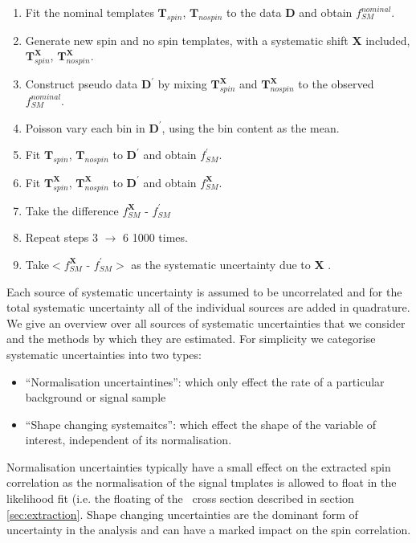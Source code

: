 \begin{enumerate}
	\item Fit the nominal templates $\mathbf{T}_{spin}$, $\mathbf{T}_{nospin}$ to the data $\mathbf{D}$ and obtain $f_{SM}^{nominal}$.
	\item Generate new spin and no spin templates, with a systematic shift \textbf{X} included, $\mathbf{T}^{\mathbf{X}}_{spin}$, $\mathbf{T}^{\mathbf{X}}_{nospin}$.
	\item Construct pseudo data $\mathbf{D^\prime}$ by mixing $\mathbf{T}^{\mathbf{X}}_{spin}$ and $\mathbf{T}^{\mathbf{X}}_{nospin}$ to the observed $f_{SM}^{nominal}$. 
        \item Poisson vary each bin in $\mathbf{D^\prime}$, using the bin content as the mean.
	\item Fit $\mathbf{T}_{spin}$, $\mathbf{T}_{nospin}$ to $\mathbf{D^\prime}$ and obtain $f_{SM}^{\prime}$.
	\item Fit $\mathbf{T}^{\mathbf{X}}_{spin}$, $\mathbf{T}^{\mathbf{X}}_{nospin}$ to $\mathbf{D^\prime}$ and obtain $f_{SM}^{\mathbf{X}}$.
	\item Take the difference $f_{SM}^{\mathbf{X}}$ - $f_{SM}^{\prime}$
	\item Repeat steps 3 $\rightarrow$ 6 1000 times.
	\item Take$<f_{SM}^{\mathbf{X}}$ - $f_{SM}^{\prime}>$ as the systematic uncertainty due to \textbf{X} .
\end{enumerate}



Each source of systematic uncertainty is assumed to be uncorrelated and for the total systematic uncertainty all of the individual sources are added in quadrature. We give an overview over all sources of systematic uncertainties that we consider and the methods by which they are estimated. For simplicity we categorise systematic uncertainties into two types: 
\begin{itemize}
	\item ``Normalisation uncertaintines'': which only effect the rate of a particular background or signal sample 
	\item ``Shape changing systemaitcs'': which effect the shape of the variable of interest, independent of its normalisation. 
\end{itemize}
Normalisation uncertainties typically have a small effect on the extracted spin correlation as the normalisation of the signal tmplates is allowed to float in the likelihood fit (i.e. the floating of the \ttbar\ cross section described in section \ref{sec:extraction}. Shape changing uncertainties are the dominant form of uncertainty in the analysis and can have a marked impact on the spin correlation.

